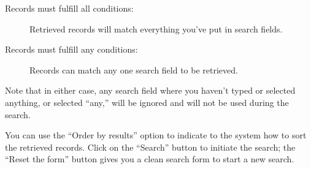 \begin{description}
\item[Records must fulfill all conditions:] Retrieved records will match everything you've put in search fields.
\item[Records must fulfill any conditions:] Records can match any one search field to be retrieved.
\end{description}

Note that in either case, any search field where you haven't typed or selected anything, or selected ``any,'' will be ignored and will not be used during the search.

You can use the ``Order by results'' option to indicate to the system how to sort the retrieved records. Click on the ``Search'' button to initiate the search; the ``Reset the form'' button gives you a clean search form to start a new search.

